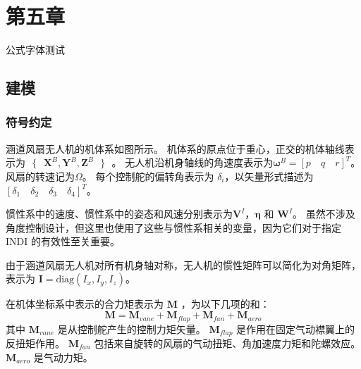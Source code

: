 \chapter{第五章}
公式字体测试

\section{建模}
\label{sec:1}
\subsection{符号约定}
涵道风扇无人机的机体系如图所示。 机体系的原点位于重心，正交的机体轴线表示为$\text{ }\!\!\{\!\!\text{ }{\boldsymbol{X}^{B}},{\boldsymbol{Y}^{B}},{\boldsymbol{Z}^{B}}\text{ }\!\!\}\!\!\text{ }$。 无人机沿机身轴线的角速度表示为${{\boldsymbol{\omega }}^{B}}=[p \quad q \quad r]^{T}$。风扇的转速记为$\Omega$。 每个控制舵的偏转角表示为 ${{\delta }_{i}}$，以矢量形式描述为$[{{\delta }_{1}} \quad {{\delta }_{2}} \quad {{\delta }_{3}} \quad {{\delta }_{4}}]^T$。



惯性系中的速度、惯性系中的姿态和风速分别表示为${{\boldsymbol{V}}^{I}}$，$\boldsymbol{\eta }$ 和 ${{\boldsymbol{W}}^{I}}$。 虽然不涉及角度控制设计，但这里也使用了这些与惯性系相关的变量，因为它们对于指定 INDI 的有效性至关重要。

由于涵道风扇无人机对所有机身轴对称，无人机的惯性矩阵可以简化为对角矩阵，表示为 $ \boldsymbol{I}=\text{diag}({{I}_{x} },{{I}_{y}},{{I}_{z}}) $。

在机体坐标系中表示的合力矩表示为 $\boldsymbol M$ ，为以下几项的和：
\begin{equation}
	{\boldsymbol{M}} = {{\boldsymbol{M}}_{vane}} + {{\boldsymbol{M}}_{flap}} + {{\boldsymbol{M}}_{fan}} + {{\boldsymbol{M}}_{aero}}
	\label{eq_1}
\end{equation}
其中 $ {{\boldsymbol{M}}_{vane}} $ 是从控制舵产生的控制力矩矢量。 $ {{\boldsymbol{M}}_{flap}} $ 是作用在固定气动襟翼上的反扭矩作用。 $ {{\boldsymbol{M}}_{fan}}$ 包括来自旋转的风扇的气动扭矩、角加速度力矩和陀螺效应。 $ {{\boldsymbol{M}}_{aero}} $ 是气动力矩。

